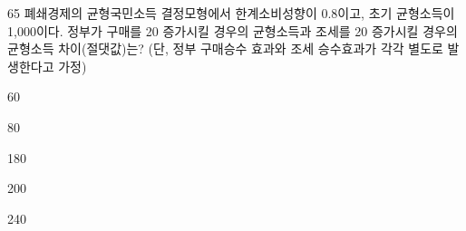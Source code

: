 \begin{question}{65}
폐쇄경제의 균형국민소득 결정모형에서 한계소비성향이 0.8이고, 초기 균형소득이 1,000이다. 정부가 구매를 20 증가시킬 경우의 균형소득과 조세를 20 증가시킬 경우의 균형소득 차이(절댓값)는? (단, 정부 구매승수 효과와 조세 승수효과가 각각 별도로 발생한다고 가정)
\begin{choices}
  \item 60
  \item 80
  \item 180
  \item 200
  \item 240
\end{choices}
\end{question}
